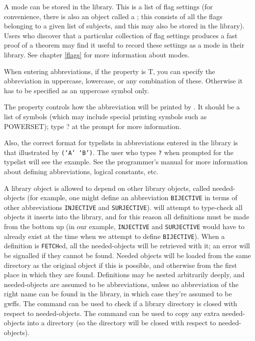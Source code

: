 A mode can be stored in the library. This is a list of flag settings (for convenience,
there is also an object called a ; this consists of
all the flags belonging to a given list of subjects, and this may also be stored
in the library). Users who discover that a particular collection of flag settings
produces a fast proof of a theorem may find it useful to record these settings
as a mode in their library. See chapter \ref{flags} for more information about
modes.

When entering abbreviations, if the  property is
T, you can specify the abbreviation in uppercase, lowercase,  or any
combination of these. Otherwise it has to be specified as an uppercase
symbol only.

The  property controls how the abbreviation will be printed by {\TPS}.
It should be a list of symbols (which may include special printing
symbols such as POWERSET); type ? at the prompt for more information.

Also, the correct format for typelists in abbreviations entered in
the library is that illustrated by {\tt (`A' `B')}.  The user who types
{\tt ?} when prompted for the typelist will see the example. See the programmer's
manual for more information about defining abbreviations, logical constants, etc.

A library object is allowed to depend on other library objects, called needed-objects
(for example, one might define an abbreviation {\tt BIJECTIVE} in terms of
other abbreviations {\tt INJECTIVE} and {\tt SURJECTIVE}). {\TPS} will attempt
to type-check all objects it inserts into the library, and for this reason all definitions
must be made from the bottom up (in our example, {\tt INJECTIVE} and {\tt SURJECTIVE}
would have to already exist at the time when we attempt to define {\tt BIJECTIVE}).
When a definition is {\tt FETCH}ed, all the needed-objects will be retrieved with it;
an error will be signalled if they cannot be found.  Needed objects will be loaded
from the same directory as the original object if this is possible, and otherwise from the first
place in which they are found.
Definitions may be nested arbitrarily deeply, and needed-objects are assumed to
be abbreviations, unless no abbreviation of the right name can be
found in the library, in which case they're assumed to be gwffs.
The command  can be used to check if a library
directory is closed with respect to needed-objects.  The command
can be used to copy any extra needed-objects into a directory (so the directory
will be closed with respect to needed-objects).

